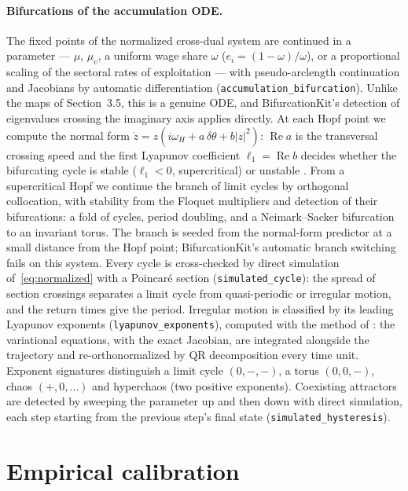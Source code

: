 \documentclass[11pt]{article}
\begin{document}
\paragraph{Bifurcations of the accumulation ODE.} The fixed points of
the normalized cross-dual system are continued in a parameter --- $\mu$,
$\mu_v$, a uniform wage share $\omega$ ($e_i=(1-\omega)/\omega$), or a
proportional scaling of the sectoral rates of exploitation --- with
pseudo-arclength continuation and Jacobians by automatic
differentiation (\texttt{accumulation\_bifurcation}). Unlike the maps of
Section~3.5, this is a genuine ODE, and BifurcationKit's detection of
eigenvalues crossing the imaginary axis applies directly. At each Hopf
point we compute the normal form $\dot z=z(i\omega_H+a\,\delta\theta+b|z|^2)$:
$\operatorname{Re}a$ is the transversal crossing speed and the first
Lyapunov coefficient $\ell_1=\operatorname{Re}b$ decides whether the
bifurcating cycle is stable ($\ell_1<0$, supercritical) or unstable
\citep{kuznetsov2004elements}. From a supercritical Hopf we continue the
branch of limit cycles by orthogonal collocation, with stability from
the Floquet multipliers and detection of their bifurcations: a fold of
cycles, period doubling, and a Neimark--Sacker bifurcation to an
invariant torus. The branch is seeded from the normal-form predictor at
a small distance from the Hopf point; BifurcationKit's automatic branch
switching fails on this system. Every cycle is cross-checked by direct
simulation of~\eqref{eq:normalized} with a Poincaré section
(\texttt{simulated\_cycle}): the spread of section crossings separates a
limit cycle from quasi-periodic or irregular motion, and the return times
give the period. Irregular motion is classified by its leading Lyapunov
exponents (\texttt{lyapunov\_exponents}), computed with the method of
\citet{benettin1980lyapunov}: the variational equations, with the exact
Jacobian, are integrated alongside the trajectory and re-orthonormalized
by QR decomposition every time unit. Exponent signatures distinguish a
limit cycle $(0,-,-)$, a torus $(0,0,-)$, chaos $(+,0,\dots)$ and
hyperchaos (two positive exponents). Coexisting attractors are detected by
sweeping the parameter up and then down with direct simulation, each
step starting from the previous step's final state
(\texttt{simulated\_hysteresis}).

\section{Empirical calibration}
\end{document}
